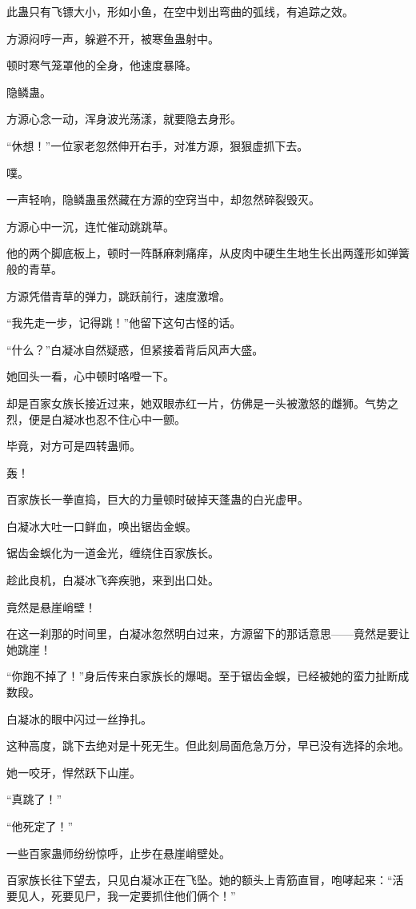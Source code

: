 \begin{this_body}
此蛊只有飞镖大小，形如小鱼，在空中划出弯曲的弧线，有追踪之效。

方源闷哼一声，躲避不开，被寒鱼蛊射中。

顿时寒气笼罩他的全身，他速度暴降。

隐鳞蛊。

方源心念一动，浑身波光荡漾，就要隐去身形。

“休想！”一位家老忽然伸开右手，对准方源，狠狠虚抓下去。

噗。

一声轻响，隐鳞蛊虽然藏在方源的空窍当中，却忽然碎裂毁灭。

方源心中一沉，连忙催动跳跳草。

他的两个脚底板上，顿时一阵酥麻刺痛痒，从皮肉中硬生生地生长出两蓬形如弹簧般的青草。

方源凭借青草的弹力，跳跃前行，速度激增。

“我先走一步，记得跳！”他留下这句古怪的话。

“什么？”白凝冰自然疑惑，但紧接着背后风声大盛。

她回头一看，心中顿时咯噔一下。

却是百家女族长接近过来，她双眼赤红一片，仿佛是一头被激怒的雌狮。气势之烈，便是白凝冰也忍不住心中一颤。

毕竟，对方可是四转蛊师。

轰！

百家族长一拳直捣，巨大的力量顿时破掉天蓬蛊的白光虚甲。

白凝冰大吐一口鲜血，唤出锯齿金蜈。

锯齿金蜈化为一道金光，缠绕住百家族长。

趁此良机，白凝冰飞奔疾驰，来到出口处。

竟然是悬崖峭壁！

在这一刹那的时间里，白凝冰忽然明白过来，方源留下的那话意思——竟然是要让她跳崖！

“你跑不掉了！”身后传来白家族长的爆喝。至于锯齿金蜈，已经被她的蛮力扯断成数段。

白凝冰的眼中闪过一丝挣扎。

这种高度，跳下去绝对是十死无生。但此刻局面危急万分，早已没有选择的余地。

她一咬牙，悍然跃下山崖。

“真跳了！”

“他死定了！”

一些百家蛊师纷纷惊呼，止步在悬崖峭壁处。

百家族长往下望去，只见白凝冰正在飞坠。她的额头上青筋直冒，咆哮起来：“活要见人，死要见尸，我一定要抓住他们俩个！”


\end{this_body}
